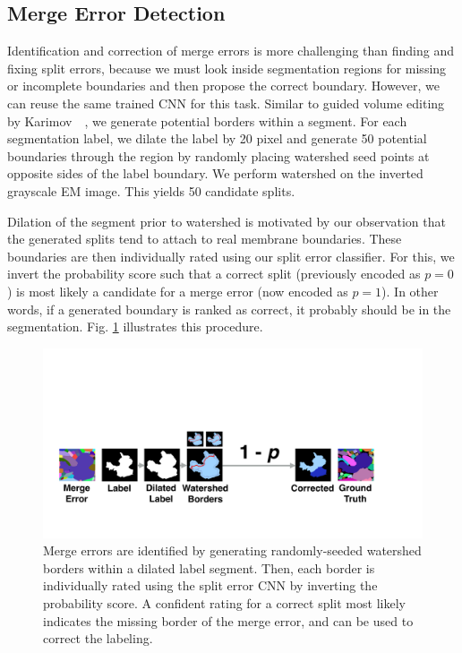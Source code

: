 \subsection{Merge Error Detection}

Identification and correction of merge errors is more challenging than finding and fixing split errors, because we must look inside segmentation regions for missing or incomplete boundaries and then propose the correct boundary. However, we can reuse the same trained CNN for this task. Similar to guided volume editing by Karimov~\etal~\cite{karimov_guided_volume_editing}, we generate potential borders within a segment. For each segmentation label, we dilate the label by 20 pixel and generate 50 potential boundaries through the region by randomly placing watershed seed points at opposite sides of the label boundary. We perform watershed on the inverted grayscale EM image. This yields 50 candidate splits.

Dilation of the segment prior to watershed is motivated by our observation that the generated splits tend to attach to real membrane boundaries. These boundaries are then individually rated using our split error classifier. For this, we invert the probability score such that a correct split (previously encoded as $p=0$) is most likely a candidate for a merge error (now encoded as $p=1$). In other words, if a generated boundary is ranked as correct, it probably should be in the segmentation. Fig. \ref{fig:merge_error} illustrates this procedure.

\begin{figure}[t]
\centering
\includegraphics[width=\linewidth]{gfx/merge_error.pdf}
\caption{Merge errors are identified by generating randomly-seeded watershed borders within a dilated label segment. Then, each border is individually rated using the split error CNN by inverting the probability score. A confident rating for a correct split most likely indicates the missing border of the merge error, and can be used to correct the labeling.}
\label{fig:merge_error}
\end{figure}

